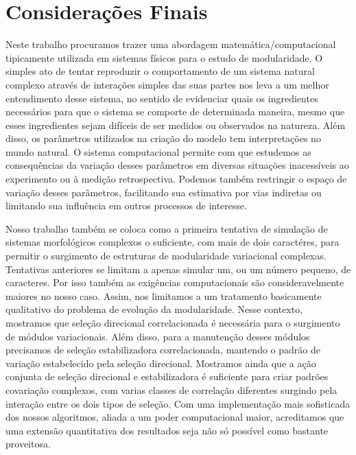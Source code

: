 \pagestyle{empty}
\cleardoublepage
\pagestyle{fancy}
\chapter{Considerações Finais}
\label{cap5}

Neste trabalho procuramos trazer uma abordagem matemática/computacional
tipicamente utilizada em sistemas físicos para o estudo de
modularidade. 
O simples ato de tentar reproduzir o comportamento de um sistema natural
complexo através de interações simples das suas partes nos leva a um melhor
entendimento desse sistema, no sentido de evidenciar quais os
ingredientes necessários para que o sistema se comporte de determinada
maneira, mesmo que esses ingredientes sejam difíceis de ser medidos ou
observados na natureza. 
Além disso, os parâmetros utilizados na criação do modelo tem
interpretações no mundo natural. 
O sistema computacional permite com que estudemos as consequências da
variação desses parâmetros em diversas situações inacessíveis ao
experimento ou à medição retrospectiva. 
Podemos também restringir o espaço de variação desses parâmetros,
facilitando sua estimativa por vias indiretas ou limitando sua
influência em outros processos de interesse. 

Nosso trabalho também se coloca como a primeira tentativa de simulação
de sistemas morfológicos complexos o suficiente, com mais de dois
caractéres, para permitir o surgimento de estruturas de modularidade
variacional complexas. 
Tentativas anteriores se limitam a apenas simular um, ou um número
pequeno, de caracteres. 
Por isso também as exigências computacionais são consideravelmente
maiores no nosso caso. 
Assim, nos limitamos a um tratamento basicamente qualitativo do problema
de evolução da modularidade. 
Nesse contexto, mostramos que seleção direcional correlacionada é
necessária para o surgimento de módulos variacionais. 
Além disso, para a manutenção desses módulos precisamos de seleção
estabilizadora correlacionada, mantendo o padrão de variação
estabelecido pela seleção direcional.
Mostramos ainda que a ação conjunta de seleção direcional e
estabilizadora é suficiente para criar padrões covariação complexos, com
varias classes de correlação diferentes surgindo pela interação entre
os dois tipos de seleção.
Com uma implementação mais sofisticada dos
nossos algoritmos, aliada a um poder computacional maior, acreditamos
que uma extensão quantitativa dos resultados seja não só possível como
bastante proveitosa. 


